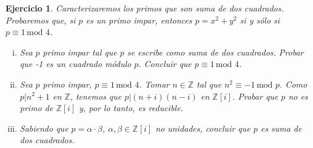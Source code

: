 \documentclass[a4paper,11pt]{article}
\newcommand{\Zm}[1]{\ensuremath{\mathbb{Z}[#1]}}
\newcommand{\Cong}[3]{\ensuremath{#1 \equiv #2 \, \textrm{mod } #3}}
\newcommand{\Div}[2]{\ensuremath{#1 | #2}}
\newtheorem*{ej}{Ejercicio}
\begin{document}
\begin{ej} 
Caracterizaremos los primos que son suma de dos cuadrados. Probaremos que, si $p$ es un
primo impar, entonces $p = x^2 + y^2$ si y sólo si $\Cong{p}{1}{4}$.

\begin{enumerate}[i.]
    \item Sea $p$ primo impar tal que $p$ se escribe como suma de dos cuadrados.
    Probar que -1 es un cuadrado módulo $p$. Concluir que $\Cong{p}{1}{4}$.

    \item Sea $p$ primo impar, $\Cong{p}{1}{4}$. Tomar $n \in \mathbb{Z}$ tal que
    $\Cong{n^2}{-1}{p}$. Como $\Div{p}{n^2 + 1}$ en $\mathbb{Z}$, tenemos que
    $\Div{p}{(n + i)(n - i)}$ en \Zm{i}. Probar que $p$ no es primo de \Zm{i} y, 
    por lo tanto, es reducible.

    \item Sabiendo que $p = \alpha \cdot \beta$, $\alpha, \beta \in \Zm{i}$ no 
    unidades, concluir que $p$ es suma de dos cuadrados.
\end{enumerate}

\end{ej}
\end{document}
